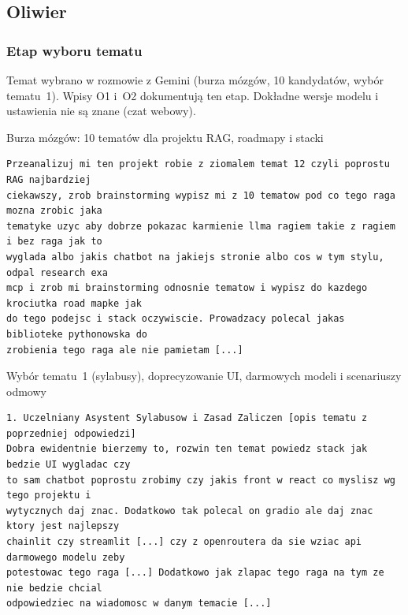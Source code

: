 
\subsection{Oliwier}
\label{app:prompty-oliwier}

\subsubsection*{Etap wyboru tematu}

Temat wybrano w rozmowie z Gemini (burza mózgów, 10 kandydatów, wybór tematu~1). Wpisy O1 i~O2
dokumentują ten etap. Dokładne wersje modelu i ustawienia nie są znane (czat webowy).

  {Burza mózgów: 10 tematów dla projektu RAG, roadmapy i stacki}
\begin{lstlisting}
Przeanalizuj mi ten projekt robie z ziomalem temat 12 czyli poprostu RAG najbardziej
ciekawszy, zrob brainstorming wypisz mi z 10 tematow pod co tego raga mozna zrobic jaka
tematyke uzyc aby dobrze pokazac karmienie llma ragiem takie z ragiem i bez raga jak to
wyglada albo jakis chatbot na jakiejs stronie albo cos w tym stylu, odpal research exa
mcp i zrob mi brainstorming odnosnie tematow i wypisz do kazdego krociutka road mapke jak
do tego podejsc i stack oczywiscie. Prowadzacy polecal jakas biblioteke pythonowska do
zrobienia tego raga ale nie pamietam [...]
\end{lstlisting}

  {Wybór tematu~1 (sylabusy), doprecyzowanie UI, darmowych modeli i scenariuszy odmowy}
\begin{lstlisting}
1. Uczelniany Asystent Sylabusow i Zasad Zaliczen [opis tematu z poprzedniej odpowiedzi]
Dobra ewidentnie bierzemy to, rozwin ten temat powiedz stack jak bedzie UI wygladac czy
to sam chatbot poprostu zrobimy czy jakis front w react co myslisz wg tego projektu i
wytycznych daj znac. Dodatkowo tak polecal on gradio ale daj znac ktory jest najlepszy
chainlit czy streamlit [...] czy z openroutera da sie wziac api darmowego modelu zeby
potestowac tego raga [...] Dodatkowo jak zlapac tego raga na tym ze nie bedzie chcial
odpowiedziec na wiadomosc w danym temacie [...]
\end{lstlisting}

